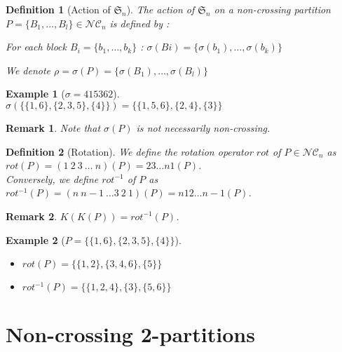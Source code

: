 \documentclass[12pt]{report}
\newtheorem{definition}{Definition}
\newtheorem*{example}{Example}
\newtheorem*{rem}{Remark}
\begin{document}
\begin{definition}[Action of $\mathfrak{S}_n$]
    The action of $\mathfrak{S}_n$ on a non-crossing partition
    $P = \{B_1, \ldots, B_l\} \in \mathcal{NC}_n$ is defined by :\\
    \begin{itemize*}
        \item For each block $B_i = \{b_1, \ldots, b_k\}$ :
        $\sigma(Bi) =\{\sigma (b_1), \ldots, \sigma (b_k)\}$ \\
        \item We denote $\rho = \sigma(P) =
            \{\sigma (B_1), \ldots, \sigma (B_l)\}$
    \end{itemize*}
\end{definition}

\begin{example}[$\sigma = 415362$]
    ~\\
    $\sigma (\{\{1, 6\}, \{2, 3, 5\}, \{4\}\}) = 
        \{\{1, 5, 6\}, \{2, 4\}, \{3\}\}$
\end{example}

\begin{rem}
    Note that $\sigma (P)$ is \emph{not} necessarily
    non-crossing.
\end{rem}

\begin{definition}[Rotation]
    We define the \emph{rotation operator} $rot$ of
    $P \in \mathcal{NC}_n$ as $rot (P) = 
    (1\ 2\ 3\  \ldots \ n)(P) = 23 \ldots n1 (P)$.\\
    Conversely, we define $rot^{-1}$ of $P$ as
    $rot^{-1}(P) = (n\ n-1\ \ldots 3\ 2\ 1)(P) = 
    n12 \ldots n-1 (P)$.
\end{definition}

\begin{rem}
    $K (K (P)) = rot^{-1} (P)$.
\end{rem}

\begin{example}[$P = \{\{1, 6\}, \{2, 3, 5\}, \{4\}\}$]
    ~\\
    \begin{itemize}
        \item $rot (P) = \{\{1, 2\}, \{3, 4, 6\}, \{5\}\}$
        \item $rot^{-1}(P) = \{\{1, 2, 4\}, \{3\}, \{5, 6\}\}$
    \end{itemize}
    
\end{example}

\section{Non-crossing 2-partitions}
\end{document}
